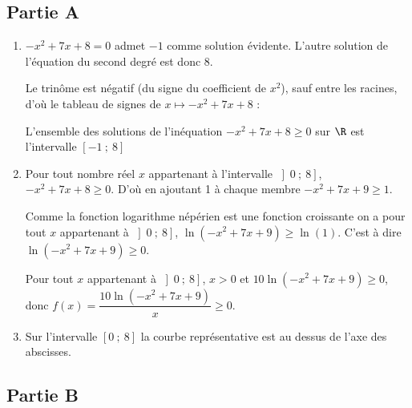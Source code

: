 \subsection*{Partie A}

\begin{enumerate}
	\item $-x^2 + 7x + 8 =0$ admet $-1$ comme solution évidente. L'autre solution de l'équation du second degré est donc $8$.

Le trinôme est négatif (du signe du coefficient de $x^2$), sauf entre les racines, d'où le tableau de signes  de $x\longmapsto -x^2 + 7x + 8 $ :
	
	
L'ensemble des solutions de l'inéquation 	$-x^2 + 7x + 8 \geqslant 0$ sur $\R$ est l'intervalle $\left[-1~;~8\right]$
	
	\item Pour tout nombre réel $x$ appartenant à l'intervalle $\left]0~;~8\right]$, $-x^2 + 7x + 8 \geqslant 0$. D'où en ajoutant 1 à chaque membre $-x^2 + 7x + 9 \geqslant 1$.

	Comme la fonction logarithme népérien est une fonction croissante on a pour tout  $x$ appartenant à $\left]0~;~8\right]$, $\ln\left(- x^2 + 7x + 9\right) \geqslant \ln(1)$. C'est à dire $\ln\left(- x^2 + 7x + 9\right) \geqslant 0$.

Pour tout $x$ appartenant à $\left]0~;~8\right]$, $x>0$ et  $10\ln\left(-x^2 + 7x + 9\right) \geqslant 0$, donc $f(x) = \dfrac{10\ln\left(-x^2 + 7x + 9\right)}{x} \geqslant 0$.

	\item Sur l'intervalle $[0~;~8]$ la courbe représentative est au dessus de l'axe des abscisses.
	
\end{enumerate}

\subsection*{Partie B}

